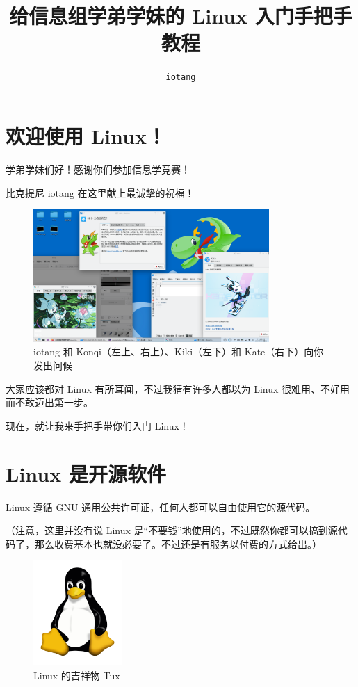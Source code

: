 \documentclass[UTF-8]{ctexart}
\title{\textbf{\huge 给信息组学弟学妹的 Linux 入门手把手教程}}
\author{\texttt{iotang}}
\begin{document}
	\maketitle
	
	\newpage
	
	\tableofcontents

	\newpage

	\section{欢迎使用 Linux！}
	
		学弟学妹们好！感谢你们参加信息学竞赛！
		
		比克提尼 iotang 在这里献上最诚挚的祝福！
			
		\begin{figure}[H]
			\centering
			\includegraphics[width=0.8\textwidth]{fig/iotangsdesktop.png}
			\caption*{iotang 和 Konqi（左上、右上）、Kiki（左下）和 Kate（右下）向你发出问候}
		\end{figure}
	
		大家应该都对 Linux 有所耳闻，不过我猜有许多人都以为 Linux 很难用、不好用而不敢迈出第一步。
		
		现在，就让我来手把手带你们入门 Linux！
		
	\newpage
	
	\section{Linux 是开源软件}
	
		Linux 遵循 GNU 通用公共许可证，任何人都可以自由使用它的源代码。
		
		（注意，这里并没有说 Linux 是“不要钱”地使用的，不过既然你都可以搞到源代码了，那么收费基本也就没必要了。不过还是有服务以付费的方式给出。）
		
		\begin{figure}[H]
			\centering
			\includegraphics[width=0.3\textwidth]{fig/tux.png}
			\caption*{Linux 的吉祥物 Tux}
		\end{figure}
		
\end{document}
